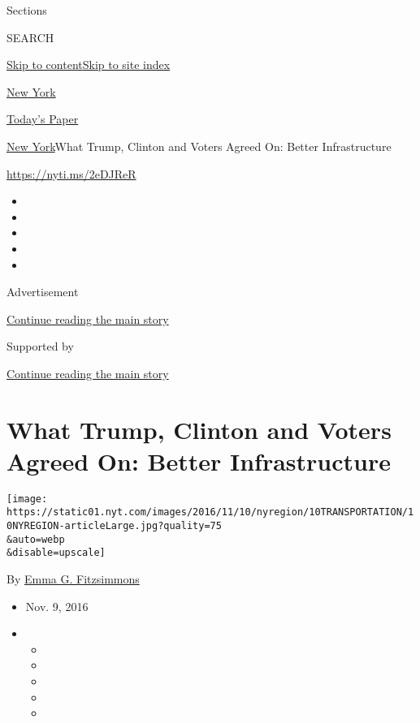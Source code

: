 Sections

SEARCH

\protect\hyperlink{site-content}{Skip to
content}\protect\hyperlink{site-index}{Skip to site index}

\href{https://www.nytimes.com/section/nyregion}{New York}

\href{https://myaccount.nytimes.com/auth/login?response_type=cookie\&client_id=vi}{}

\href{https://www.nytimes.com/section/todayspaper}{Today's Paper}

\href{/section/nyregion}{New York}\textbar{}What Trump, Clinton and
Voters Agreed On: Better Infrastructure

\url{https://nyti.ms/2eDJReR}

\begin{itemize}
\item
\item
\item
\item
\item
\end{itemize}

Advertisement

\protect\hyperlink{after-top}{Continue reading the main story}

Supported by

\protect\hyperlink{after-sponsor}{Continue reading the main story}

\hypertarget{what-trump-clinton-and-voters-agreed-on-better-infrastructure}{%
\section{What Trump, Clinton and Voters Agreed On: Better
Infrastructure}\label{what-trump-clinton-and-voters-agreed-on-better-infrastructure}}

\texttt{[image: https://static01.nyt.com/images/2016/11/10/nyregion/10TRANSPORTATION/10NYREGION-articleLarge.jpg?quality=75\\\&auto=webp\\\&disable=upscale]}

By \href{http://www.nytimes.com/by/emma-g-fitzsimmons}{Emma G.
Fitzsimmons}

\begin{itemize}
\item
  Nov. 9, 2016
\item
  \begin{itemize}
  \item
  \item
  \item
  \item
  \item
  \end{itemize}
\end{itemize}

